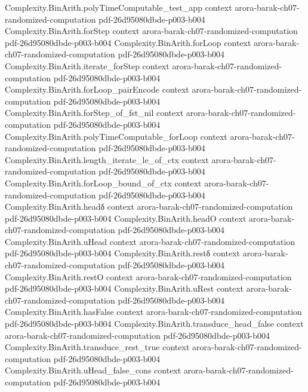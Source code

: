 \begin{theorem}
\proofstep
  {Complexity.BinArith.polyTimeComputable_test_app}
  {context}
  {arora-barak-ch07-randomized-computation}
  {pdf-26d95080dbde-p003-b004}
\proofstep
  {Complexity.BinArith.forStep}
  {context}
  {arora-barak-ch07-randomized-computation}
  {pdf-26d95080dbde-p003-b004}
\proofstep
  {Complexity.BinArith.forLoop}
  {context}
  {arora-barak-ch07-randomized-computation}
  {pdf-26d95080dbde-p003-b004}
\proofstep
  {Complexity.BinArith.iterate_forStep}
  {context}
  {arora-barak-ch07-randomized-computation}
  {pdf-26d95080dbde-p003-b004}
\proofstep
  {Complexity.BinArith.forLoop_pairEncode}
  {context}
  {arora-barak-ch07-randomized-computation}
  {pdf-26d95080dbde-p003-b004}
\proofstep
  {Complexity.BinArith.forStep_of_fst_nil}
  {context}
  {arora-barak-ch07-randomized-computation}
  {pdf-26d95080dbde-p003-b004}
\proofstep
  {Complexity.BinArith.polyTimeComputable_forLoop}
  {context}
  {arora-barak-ch07-randomized-computation}
  {pdf-26d95080dbde-p003-b004}
\proofstep
  {Complexity.BinArith.length_iterate_le_of_ctx}
  {context}
  {arora-barak-ch07-randomized-computation}
  {pdf-26d95080dbde-p003-b004}
\proofstep
  {Complexity.BinArith.forLoop_bound_of_ctx}
  {context}
  {arora-barak-ch07-randomized-computation}
  {pdf-26d95080dbde-p003-b004}
\proofstep
  {Complexity.BinArith.headδ}
  {context}
  {arora-barak-ch07-randomized-computation}
  {pdf-26d95080dbde-p003-b004}
\proofstep
  {Complexity.BinArith.headO}
  {context}
  {arora-barak-ch07-randomized-computation}
  {pdf-26d95080dbde-p003-b004}
\proofstep
  {Complexity.BinArith.uHead}
  {context}
  {arora-barak-ch07-randomized-computation}
  {pdf-26d95080dbde-p003-b004}
\proofstep
  {Complexity.BinArith.restδ}
  {context}
  {arora-barak-ch07-randomized-computation}
  {pdf-26d95080dbde-p003-b004}
\proofstep
  {Complexity.BinArith.restO}
  {context}
  {arora-barak-ch07-randomized-computation}
  {pdf-26d95080dbde-p003-b004}
\proofstep
  {Complexity.BinArith.uRest}
  {context}
  {arora-barak-ch07-randomized-computation}
  {pdf-26d95080dbde-p003-b004}
\proofstep
  {Complexity.BinArith.hasFalse}
  {context}
  {arora-barak-ch07-randomized-computation}
  {pdf-26d95080dbde-p003-b004}
\proofstep
  {Complexity.BinArith.transduce_head_false}
  {context}
  {arora-barak-ch07-randomized-computation}
  {pdf-26d95080dbde-p003-b004}
\proofstep
  {Complexity.BinArith.transduce_rest_true}
  {context}
  {arora-barak-ch07-randomized-computation}
  {pdf-26d95080dbde-p003-b004}
\proofstep
  {Complexity.BinArith.uHead_false_cons}
  {context}
  {arora-barak-ch07-randomized-computation}
  {pdf-26d95080dbde-p003-b004}
\proofstep

\end{theorem}
